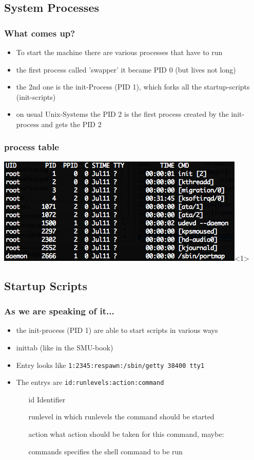 \documentclass[handout]{beamer}
\newcommand{\code}[1]{\colorbox{lGray}{\texttt{#1}}}
\begin{document}
    \subsection{System Processes}
	    \begin{frame}
			\frametitle{What comes up?}
			\begin{itemize}
                \item<1-> To start the machine there are various processes that have to run
                \item<1-> the first process called 'swapper' it became PID 0 (but lives not long)
                \item<2-> the 2nd one is the init-Process (PID 1), which forks all the startup-scripts (init-scripts)
                \item<3-> on usual Unix-Systems the PID 2 is the first process created by the init-process and gets the PID 2
            \end{itemize}
		\end{frame}
	    \begin{frame}
			\frametitle{process table}
			\includegraphics[height=0.4\columnwidth]{pics/ps.png}<1>%
		\end{frame}
    \subsection{Startup Scripts}
	    \begin{frame}
			\frametitle{As we are speaking of it...}
			\begin{itemize}
                \item<1-> the init-process (PID 1) are able to start scripts in various ways
                \item<1-> inittab (like in the SMU-book)
                \item<1-> Entry looks like \code{1:2345:respawn:/sbin/getty 38400 tty1}
                \item<2-> The entrys are \code{id:runlevels:action:command}
                \begin{itemize}
                    \item[id] Identifier 
                    \item[runlevel] in which runlevels the command should be started 
                    \item[action] what action should be taken for this command, maybe:
                    \item[commands] specifies the shell command to be run
                \end{itemize}
            \end{itemize}
		\end{frame}
\end{document}
